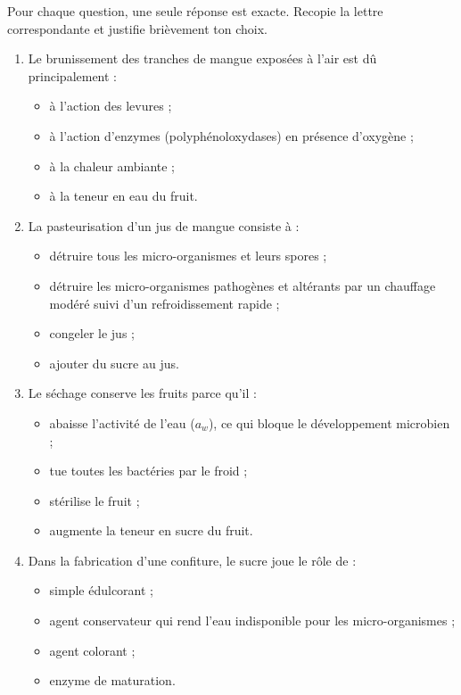 \documentclass[11pt]{article}
\begin{document}
\begin{exercice}
Pour chaque question, une seule réponse est exacte. Recopie la lettre correspondante et justifie brièvement ton choix.
\begin{enumerate}
\item Le brunissement des tranches de mangue exposées à l'air est dû principalement :
\begin{itemize}
\item[a)] à l'action des levures ;
\item[b)] à l'action d'enzymes (polyphénoloxydases) en présence d'oxygène ;
\item[c)] à la chaleur ambiante ;
\item[d)] à la teneur en eau du fruit.
\end{itemize}
\item La pasteurisation d'un jus de mangue consiste à :
\begin{itemize}
\item[a)] détruire tous les micro-organismes et leurs spores ;
\item[b)] détruire les micro-organismes pathogènes et altérants par un chauffage modéré suivi d'un refroidissement rapide ;
\item[c)] congeler le jus ;
\item[d)] ajouter du sucre au jus.
\end{itemize}
\item Le séchage conserve les fruits parce qu'il :
\begin{itemize}
\item[a)] abaisse l'activité de l'eau ($a_w$), ce qui bloque le développement microbien ;
\item[b)] tue toutes les bactéries par le froid ;
\item[c)] stérilise le fruit ;
\item[d)] augmente la teneur en sucre du fruit.
\end{itemize}
\item Dans la fabrication d'une confiture, le sucre joue le rôle de :
\begin{itemize}
\item[a)] simple édulcorant ;
\item[b)] agent conservateur qui rend l'eau indisponible pour les micro-organismes ;
\item[c)] agent colorant ;
\item[d)] enzyme de maturation.
\end{itemize}
\end{enumerate}
\end{exercice}
\end{document}
